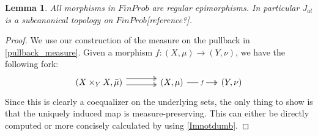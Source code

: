 \documentclass[a4paper]{amsproc}
\theoremstyle{plain}
\newtheorem{theorem}{Theorem}[section]
\newtheorem{lemma}{Lemma}[section]
\theoremstyle{definition}
\theoremstyle{remark}
\numberwithin{equation}{section}
\begin{document}
\begin{lemma}\label{subcanonical} All morphisms in $FinProb$ are regular epimorphisms. In particular $J_{at}$ is a subcanonical topology on $FinProb$[reference?].
\end{lemma}
\begin{proof}
We use our construction of the measure on the pullback in \ref{pullback_measure}. Given a morphism $f:(X,\mu)\rightarrow (Y, \nu)$, we have the following fork:
\[
\begin{tikzcd}[column sep=large]
(X \times_Y X, \bar{\mu}) \arrow[r, two heads, shift left=2] \arrow[r, two heads, shift right] & (X,\mu) \arrow[r, "f" description, two heads] & (Y,\nu)
\end{tikzcd}
\]
Since this is clearly a coequalizer on the underlying sets, the only thing to show is that the uniquely induced map is measure-preserving. This can either be directly computed or more concisely calculated by using \ref{Imnotdumb}.
\end{proof}
\end{document}
